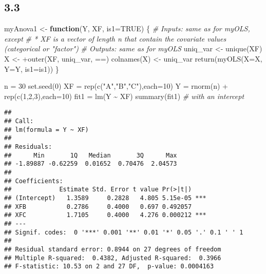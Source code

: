 \documentclass[
  11pt,
]{article}
\newenvironment{Shaded}{\begin{snugshade}}{\end{snugshade}}
\newcommand{\AttributeTok}[1]{\textcolor[rgb]{0.77,0.63,0.00}{#1}}
\newcommand{\CommentTok}[1]{\textcolor[rgb]{0.56,0.35,0.01}{\textit{#1}}}
\newcommand{\ConstantTok}[1]{\textcolor[rgb]{0.00,0.00,0.00}{#1}}
\newcommand{\ControlFlowTok}[1]{\textcolor[rgb]{0.13,0.29,0.53}{\textbf{#1}}}
\newcommand{\DecValTok}[1]{\textcolor[rgb]{0.00,0.00,0.81}{#1}}
\newcommand{\FunctionTok}[1]{\textcolor[rgb]{0.00,0.00,0.00}{#1}}
\newcommand{\NormalTok}[1]{#1}
\newcommand{\OtherTok}[1]{\textcolor[rgb]{0.56,0.35,0.01}{#1}}
\newcommand{\SpecialCharTok}[1]{\textcolor[rgb]{0.00,0.00,0.00}{#1}}
\newcommand{\StringTok}[1]{\textcolor[rgb]{0.31,0.60,0.02}{#1}}
\begin{document}
\hypertarget{section-2}{%
\subsection{3.3}\label{section-2}}

\begin{Shaded}
\begin{Highlighting}[]
\NormalTok{myAnova1 }\OtherTok{\textless{}{-}} \ControlFlowTok{function}\NormalTok{(Y, XF, }\AttributeTok{is1=}\ConstantTok{TRUE}\NormalTok{) \{}
\CommentTok{\# Inputs: same as for myOLS, except}
\CommentTok{\# * XF is a vector of length n that contain the covariate values (categorical or "factor")}
\CommentTok{\# Outputs: same as for myOLS}
\NormalTok{  uniq\_var }\OtherTok{\textless{}{-}} \FunctionTok{unique}\NormalTok{(XF)}
\NormalTok{  X }\OtherTok{\textless{}{-}} \SpecialCharTok{+}\FunctionTok{outer}\NormalTok{(XF, uniq\_var, }\StringTok{\textasciigrave{}}\AttributeTok{==}\StringTok{\textasciigrave{}}\NormalTok{)}
  \FunctionTok{colnames}\NormalTok{(X) }\OtherTok{\textless{}{-}}\NormalTok{ uniq\_var}
  \FunctionTok{return}\NormalTok{(}\FunctionTok{myOLS}\NormalTok{(}\AttributeTok{X=}\NormalTok{X, }\AttributeTok{Y=}\NormalTok{Y, }\AttributeTok{is1=}\NormalTok{is1))}
\NormalTok{\}}
\end{Highlighting}
\end{Shaded}

\begin{Shaded}
\begin{Highlighting}[]
\NormalTok{n }\OtherTok{=} \DecValTok{30}
\FunctionTok{set.seed}\NormalTok{(}\DecValTok{0}\NormalTok{)}
\NormalTok{XF }\OtherTok{=} \FunctionTok{rep}\NormalTok{(}\FunctionTok{c}\NormalTok{(}\StringTok{"A"}\NormalTok{,}\StringTok{"B"}\NormalTok{,}\StringTok{"C"}\NormalTok{),}\AttributeTok{each=}\DecValTok{10}\NormalTok{)}
\NormalTok{Y }\OtherTok{=} \FunctionTok{rnorm}\NormalTok{(n) }\SpecialCharTok{+} \FunctionTok{rep}\NormalTok{(}\FunctionTok{c}\NormalTok{(}\DecValTok{1}\NormalTok{,}\DecValTok{2}\NormalTok{,}\DecValTok{3}\NormalTok{),}\AttributeTok{each=}\DecValTok{10}\NormalTok{)}
\NormalTok{fit1 }\OtherTok{=} \FunctionTok{lm}\NormalTok{(Y }\SpecialCharTok{\textasciitilde{}}\NormalTok{ XF)}
\FunctionTok{summary}\NormalTok{(fit1) }\CommentTok{\# with an intercept}
\end{Highlighting}
\end{Shaded}

\begin{verbatim}
## 
## Call:
## lm(formula = Y ~ XF)
## 
## Residuals:
##      Min       1Q   Median       3Q      Max 
## -1.89887 -0.62259  0.01652  0.70476  2.04573 
## 
## Coefficients:
##             Estimate Std. Error t value Pr(>|t|)    
## (Intercept)   1.3589     0.2828   4.805 5.15e-05 ***
## XFB           0.2786     0.4000   0.697 0.492057    
## XFC           1.7105     0.4000   4.276 0.000212 ***
## ---
## Signif. codes:  0 '***' 0.001 '**' 0.01 '*' 0.05 '.' 0.1 ' ' 1
## 
## Residual standard error: 0.8944 on 27 degrees of freedom
## Multiple R-squared:  0.4382, Adjusted R-squared:  0.3966 
## F-statistic: 10.53 on 2 and 27 DF,  p-value: 0.0004163
\end{verbatim}
\end{document}
